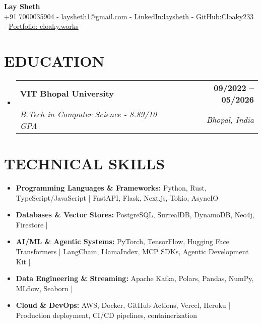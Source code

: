 \documentclass[letterpaper,11pt]{article}
\makeatletter
\def\spaceBelowHeaderContact{-2pt}
\def\spaceBelowEdSec{-8pt}
\def\spaceBelowTechSecContent{-8pt}
\def\spaceBetweenResumeItems{-4pt}
\def\spaceBetweenSubheadings{-1pt}
\def\spaceAfterSubheading{-7pt}
\newcommand{\resumeItem}[1]{
  \item\small{
    {#1 \vspace{\spaceBetweenResumeItems}}
  }
}
\newcommand{\resumeSubheading}[4]{
  \vspace{\spaceBetweenSubheadings}\item
    \begin{tabular*}{1.0\textwidth}[t]{l@{\extracolsep{\fill}}r}
      \textbf{\normalsize#1} & \textbf{\small #2} \\
      \textit{\normalsize#3} & \textit{\small #4} \\
    \end{tabular*}\vspace{\spaceAfterSubheading}
}
\newcommand{\resumeSubHeadingListStart}{\begin{itemize}[leftmargin=0.0in, label={}]}
\newcommand{\resumeSubHeadingListEnd}{\end{itemize}\vspace{\spaceBelowEdSec}}
\newcommand{\resumeItemListStart}{\begin{itemize}[leftmargin=0.1in]}
\newcommand{\resumeItemListEnd}{\end{itemize}\vspace{\spaceBelowTechSecContent}}
\makeatother
\begin{document}
\begin{center}
    {\huge \textbf{Lay Sheth}} \\ \vspace{1pt}
    {+91 7000035904}
    \small{ - }
    {\href{mailto://laysheth1@gmail.com}{laysheth1@gmail.com}}
    \small{ - }
    {\href{https://www.linkedin.com/in/laysheth}{LinkedIn:laysheth}}
    \small{ - }
    {\href{https://github.com/CLoaKY233}{GitHub:Cloaky233}}
    \small{ - }
    {\href{https://cloaky.works}{Portfolio: cloaky.works}}
    \vspace{\spaceBelowHeaderContact}
\end{center}

\section{{EDUCATION}}
\resumeSubHeadingListStart
    \resumeSubheading
      {VIT Bhopal University}{09/2022 -- 05/2026}
      {B.Tech in Computer Science - 8.89/10 GPA}{Bhopal, India}
\resumeSubHeadingListEnd


\section{TECHNICAL SKILLS}
\resumeItemListStart
    \resumeItem{
        \textbf{Programming Languages \& Frameworks:} Python, Rust, TypeScript/JavaScript | FastAPI, Flask, Next.js, Tokio, AsyncIO
    }
    \resumeItem{
        \textbf{Databases \& Vector Stores:} PostgreSQL, SurrealDB, DynamoDB, Neo4j, Firestore |
    }
    \resumeItem{
        \textbf{AI/ML \& Agentic Systems:} PyTorch, TensorFlow, Hugging Face Transformers | LangChain, LlamaIndex, MCP SDKs, Agentic Development Kit |
    }
    \resumeItem{
        \textbf{Data Engineering \& Streaming:} Apache Kafka, Polars, Pandas, NumPy, MLflow, Seaborn |
    }
    \resumeItem{
        \textbf{Cloud \& DevOps:} AWS, Docker, GitHub Actions, Vercel, Heroku | Production deployment, CI/CD pipelines, containerization
    }
\resumeItemListEnd


\vspace{-2pt}



\end{document}
